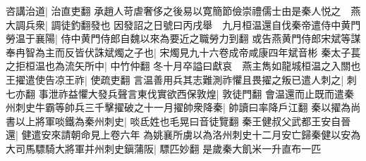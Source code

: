咨講治道|{
	治直吏翻}
承趙人苛虐奢侈之後易以寛簡節儉崇禮儒士由是秦人悦之　燕大調兵衆|{
	調徒釣翻發也}
因發詔之日號曰丙戌舉　九月桓温還自伐秦帝遣侍中黄門勞温于襄陽|{
	侍中黄門侍郎自魏以來為要近之職勞力到翻}
或告燕黄門侍郎宋斌等謀奉冉智為主而反皆伏誅斌燭之子也|{
	宋燭見九十六卷成帝咸康四年斌音彬}
秦太子萇之拒桓温也為流矢所中|{
	中竹仲翻}
冬十月卒謚曰獻哀　燕主雋如龍城桓温之入關也王擢遣使告凉王祚|{
	使疏吏翻}
言温善用兵其志難測祚懼且畏擢之叛已遣人刺之|{
	刺七亦翻}
事泄祚益懼大發兵聲言東伐實欲西保敦煌|{
	敦徒門翻}
會温還而止既而遣秦州刺史牛霸等帥兵三千擊擢破之十一月擢帥衆降秦|{
	帥讀曰率降戶江翻}
秦以擢為尚書以上將軍啖鐵為秦州刺史|{
	啖氐姓也毛晃曰音徒覽翻}
秦王健叔父武都王安自晉還|{
	健遣安來請朝命見上卷六年}
為姚襄所虜以為洛州刺史十二月安亡歸秦健以安為大司馬驃騎大將軍并州刺史鎭蒲阪|{
	驃匹妙翻}
是歲秦大飢米一升直布一匹

